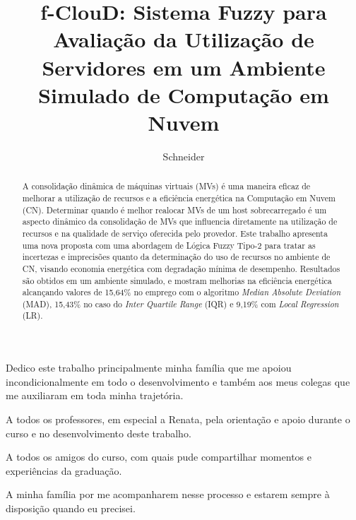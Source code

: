 \documentclass[tcc,capa]{texufpel}
\title{f-ClouD: Sistema Fuzzy para Avaliação da Utilização de Servidores em um Ambiente Simulado de Computação em Nuvem}
\author{Schneider}{Guilherme Bayer}
\begin{document}
\renewcommand{\advisorname}{Orientadora}           %

\maketitle 

\sloppy

\fichacatalografica

\folhadeaprovacao

\begin{dedicatoria}
  Dedico este trabalho principalmente minha família que me apoiou incondicionalmente em todo o desenvolvimento e também aos meus colegas que me auxiliaram em toda minha trajetória.
\end{dedicatoria}

\begin{agradecimentos}
  A todos os professores, em especial a Renata, pela orientação e apoio durante o curso e no desenvolvimento deste trabalho.
  
  A todos os amigos do curso, com quais pude compartilhar momentos e experiências da graduação.
  
  A minha família por me acompanharem nesse processo e estarem sempre à disposição quando eu precisei.
\end{agradecimentos}


\begin{abstract}
  A consolidação dinâmica de máquinas virtuais (MVs) é uma maneira eficaz de melhorar a utilização de recursos e a eficiência energética na Computação em Nuvem (CN). Determinar quando é melhor realocar MVs de um host sobrecarregado é um aspecto dinâmico da consolidação de MVs que influencia diretamente na utilização de recursos e na qualidade de serviço oferecida pelo provedor. Este trabalho apresenta uma nova proposta com uma abordagem de Lógica Fuzzy Tipo-2 para tratar as incertezas e imprecisões quanto da determinação do uso de recursos no ambiente de CN, visando economia energética com degradação mínima de desempenho. Resultados são obtidos em um ambiente simulado, e mostram melhorias na eficiência energética alcançando valores de 15,64\% no emprego com o algoritmo \textit{Median Absolute Deviation} (MAD), 15,43\% no caso do \textit{Inter Quartile Range} (IQR) e 9,19\% com \textit{Local Regression} (LR).
\end{abstract}
\end{document}
